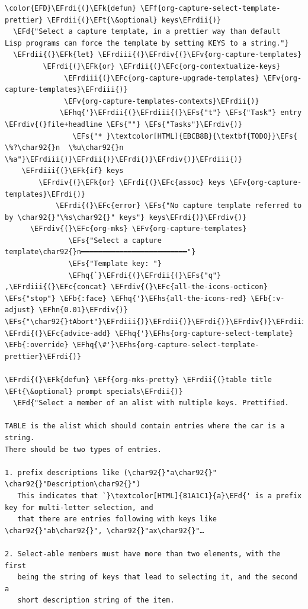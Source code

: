 \documentclass{scrartcl}
\newcommand{\EFk}[1]{\textcolor{EFk}{#1}} %
\newcommand{\EFd}[1]{\textcolor{EFd}{#1}} %
\newcommand{\EFt}[1]{\textcolor{EFt}{#1}} %
\newcommand{\EFs}[1]{\textcolor{EFs}{#1}} %
\newcommand{\EFb}[1]{\textcolor{EFb}{#1}} %
\newcommand{\EFc}[1]{\textcolor{EFc}{#1}} %
\newcommand{\EFv}[1]{\textcolor{EFv}{#1}} %
\newcommand{\EFf}[1]{\textcolor{EFf}{#1}} %
\newcommand{\EFhn}[1]{#1} %
\newcommand{\EFhq}[1]{#1} %
\newcommand{\EFhs}[1]{#1} %
\newcommand{\EFrdi}[1]{#1} %
\newcommand{\EFrdii}[1]{#1} %
\newcommand{\EFrdiii}[1]{#1} %
\newcommand{\EFrdiv}[1]{#1} %
\begin{document}
\begin{Code}
\begin{Verbatim}[]
\color{EFD}\EFrdi{(}\EFk{defun} \EFf{org-capture-select-template-prettier} \EFrdii{(}\EFt{\&optional} keys\EFrdii{)}
  \EFd{"Select a capture template, in a prettier way than default
Lisp programs can force the template by setting KEYS to a string."}
  \EFrdii{(}\EFk{let} \EFrdiii{(}\EFrdiv{(}\EFv{org-capture-templates}
         \EFrdi{(}\EFk{or} \EFrdii{(}\EFc{org-contextualize-keys}
              \EFrdiii{(}\EFc{org-capture-upgrade-templates} \EFv{org-capture-templates}\EFrdiii{)}
              \EFv{org-capture-templates-contexts}\EFrdii{)}
             \EFhq{'}\EFrdii{(}\EFrdiii{(}\EFs{"t"} \EFs{"Task"} entry \EFrdiv{(}file+headline \EFs{""} \EFs{"Tasks"}\EFrdiv{)}
                \EFs{"* }\textcolor[HTML]{EBCB8B}{\textbf{TODO}}\EFs{ \%?\char92{}n  \%u\char92{}n  \%a"}\EFrdiii{)}\EFrdii{)}\EFrdi{)}\EFrdiv{)}\EFrdiii{)}
    \EFrdiii{(}\EFk{if} keys
        \EFrdiv{(}\EFk{or} \EFrdi{(}\EFc{assoc} keys \EFv{org-capture-templates}\EFrdi{)}
            \EFrdi{(}\EFc{error} \EFs{"No capture template referred to by \char92{}"\%s\char92{}" keys"} keys\EFrdi{)}\EFrdiv{)}
      \EFrdiv{(}\EFc{org-mks} \EFv{org-capture-templates}
               \EFs{"Select a capture template\char92{}n━━━━━━━━━━━━━━━━━━━━━━━━━"}
               \EFs{"Template key: "}
               \EFhq{`}\EFrdi{(}\EFrdii{(}\EFs{"q"} ,\EFrdiii{(}\EFc{concat} \EFrdiv{(}\EFc{all-the-icons-octicon} \EFs{"stop"} \EFb{:face} \EFhq{'}\EFhs{all-the-icons-red} \EFb{:v-adjust} \EFhn{0.01}\EFrdiv{)} \EFs{"\char92{}tAbort"}\EFrdiii{)}\EFrdii{)}\EFrdi{)}\EFrdiv{)}\EFrdiii{)}\EFrdii{)}\EFrdi{)}
\EFrdi{(}\EFc{advice-add} \EFhq{'}\EFhs{org-capture-select-template} \EFb{:override} \EFhq{\#'}\EFhs{org-capture-select-template-prettier}\EFrdi{)}

\EFrdi{(}\EFk{defun} \EFf{org-mks-pretty} \EFrdii{(}table title \EFt{\&optional} prompt specials\EFrdii{)}
  \EFd{"Select a member of an alist with multiple keys. Prettified.

TABLE is the alist which should contain entries where the car is a string.
There should be two types of entries.

1. prefix descriptions like (\char92{}"a\char92{}" \char92{}"Description\char92{}")
   This indicates that `}\textcolor[HTML]{81A1C1}{a}\EFd{' is a prefix key for multi-letter selection, and
   that there are entries following with keys like \char92{}"ab\char92{}", \char92{}"ax\char92{}"…

2. Select-able members must have more than two elements, with the first
   being the string of keys that lead to selecting it, and the second a
   short description string of the item.


\end{Verbatim}
\end{Code}
\end{document}
